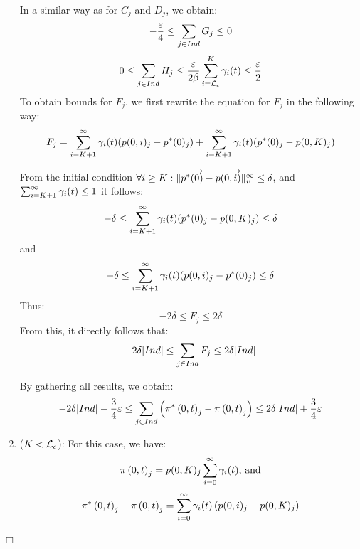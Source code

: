\documentclass[a4paper,11pt]{article}
\newenvironment{proof}{\trivlist \item[\hskip \labelsep{\bf Proof}]}{\hfill\hbox{$\Box$}\endtrivlist}
\begin{document}
\begin{proof}
\begin{enumerate}
					In a similar way as for $C_{j}$ and $D_{j}$, we obtain:
					\begin{equation}
						- \frac{\varepsilon}{4} \leq \sum_{j \in Ind} G_{j} \leq 0 \nonumber
					\end{equation}
					\begin{equation}
						 0 \leq \sum_{j \in Ind} H_{j} \leq \frac{\varepsilon}{2 \beta} \sum_{i=\mathcal{L}_{\epsilon}}^{K} \gamma_{i}(t) \leq \frac{\varepsilon}{2} \nonumber
					\end{equation}
						To obtain bounds for $F_{j}$, we first rewrite the equation for $F_{j}$ in the following way:
					\begin{equation}
						F_{j} = \sum_{i=K+1}^{\infty}\gamma_{i}(t) (p(0,i)_{j} - p^{*}(0)_{j}) + \sum_{i=K+1}^{\infty} \gamma_{i}(t) (p^{*}(0)_{j} - p(0,K)_{j}) \nonumber
					\end{equation}
							
					From the initial condition $\forall i \geq K : \lVert  \overrightarrow{p^{*}(0)} - \overrightarrow{p(0,i)}  \rVert_{v}^{\infty} \leq \delta$, and $\sum_{i=K+1}^{\infty}\gamma_{i}(t) \leq 1$ it follows:  
					\begin{equation}
						- \delta \leq \sum_{i=K+1}^{\infty} \gamma_{i}(t) (p^{*}(0)_{j} - p(0,K)_{j}) \leq \delta \nonumber
					\end{equation}
					and
					\begin{equation}
						 - \delta \leq \sum_{i=K+1}^{\infty}\gamma_{i}(t) (p(0,i)_{j} - p^{*}(0)_{j}) \leq \delta \nonumber
					\end{equation}
					Thus:
					\begin{equation}
						- 2 \delta \leq F_{j} \leq 2 \delta \nonumber
					\end{equation}
					From this, it directly follows that:
					\begin{equation}
						- 2 \delta |Ind| \leq \sum_{j \in Ind} F_{j} \leq 2 \delta | Ind | \nonumber
					\end{equation}

					By gathering all results, we obtain:
					 \begin{equation}	
						- 2\delta | Ind | - \frac{3}{4}\varepsilon \leq \sum_{j \in Ind} \left( \pi^{*} \left(0, t \right )_{j} - \pi \left(0, t \right )_{j} \right) \leq 2 \delta | Ind | + \frac{3}{4} \varepsilon \nonumber
					\end{equation}
					
				\item ($K < \mathcal{L}_{\epsilon}$): For this case, we have:
					\begin{equation}
						\pi \left(0, t \right )_{j} = p(0,K)_{j} \sum_{i=0}^{\infty} \gamma_{i}(t) \text{, and} \nonumber
					\end{equation}
					\begin{equation}
						\pi^{*} \left(0, t \right )_{j} - \pi \left(0, t \right )_{j} = \sum_{i=0}^{\infty} \gamma_{i}(t) \left( p(0,i)_{j} - p(0,K)_{j} \right) \nonumber
					\end{equation}
						

\end{enumerate}
\end{proof}
\end{document}
